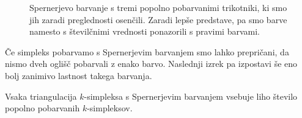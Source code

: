 \documentclass[mat1]{fmfdelo}
\newcommand{\0}{\underline{0}}
\begin{document}
\begin{figure}[h!]
	\caption{Spernerjevo barvanje s tremi popolno pobarvanimi trikotniki, ki smo jih zaradi preglednosti osenčili. Zaradi lepše predstave, pa smo barve namesto s številčnimi vrednosti ponazorili s pravimi barvami.}
\end{figure}
Če simpleks pobarvamo s Spernerjevim barvanjem smo lahko prepričani, da nismo dveh oglišč pobarvali z enako barvo. Naslednji izrek pa izpostavi še eno bolj zanimivo lastnost takega barvanja.
\begin{lema}\label{izr:sperner}
Vsaka triangulacija $k$-simpleksa s Spernerjevim barvanjem vsebuje liho število popolno pobarvanih $k$-simpleksov.
\end{lema}
\end{document}

